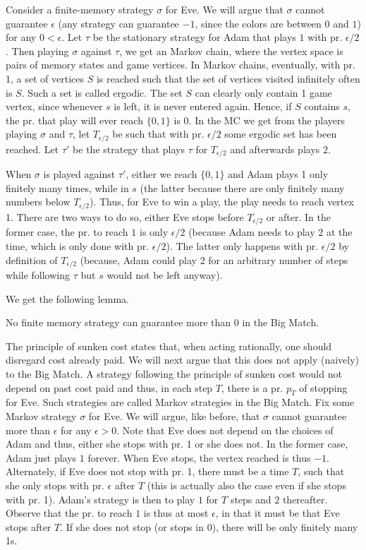 Consider a finite-memory strategy $\sigma$ for Eve. We will argue that $\sigma$ cannot guarantee $\epsilon$ (any strategy can guarantee $-1$, since the colors are between $0$ and $1$) for any $0<\epsilon$. Let $\tau$ be the stationary strategy for Adam that plays $1$ with pr. $\epsilon/2$.
Then playing $\sigma$ against $\tau$, we get an Markov chain, where the vertex space is pairs of memory states and game vertices. 
In Markov chains, eventually, with pr. 1, a set of vertices $S$ is reached such that the set of vertices visited infinitely often is $S$. Such a set is called ergodic.
The set $S$ can clearly only contain 1 game vertex, since whenever $s$ is left, it is never entered again.
Hence, if $S$ contains $s$, the pr. that play will ever reach $\{0,1\}$ is 0.
In the MC we get from the players playing $\sigma$ and $\tau$, let $T_{\epsilon/2}$ be such that with pr. $\epsilon/2$ some ergodic set has been reached. 
Let $\tau'$ be the strategy that plays $\tau$ for $T_{\epsilon/2}$ and afterwards plays $2$. 

When $\sigma$ is played against $\tau'$, either we reach $\{0,1\}$ and Adam plays 1 only finitely many times, while in $s$ (the latter because there are only finitely many numbers below $T_{\epsilon/2}$). Thus, for Eve to win a play, the play needs to reach vertex 1. There are two ways to do so, either Eve stops before $T_{\epsilon/2}$ or after. In the former case, the pr. to reach $1$ is only $\epsilon/2$ (because Adam needs to play $2$ at the time, which is only done with pr. $\epsilon/2$). The latter only happens with pr. $\epsilon/2$ by definition of $T_{\epsilon/2}$ (because, Adam could play $2$ for an arbitrary number of steps while following $\tau$ but $s$ would not be left anyway).

We get the following lemma.

\begin{lemma}\label{lemm:no_finite_meanpayoff}
No finite memory strategy can guarantee more than $0$ in the Big Match.
\end{lemma}

The principle of sunken cost states that, when acting rationally, one should disregard cost already paid. We will next argue that this does not apply (naively) to the Big Match.
A strategy following the principle of sunken cost would not depend on past cost paid and thus, in each step $T$, there is a pr. $p_T$ of stopping for Eve.
Such strategies are called Markov strategies in the Big Match.
Fix some Markov strategy $\sigma$ for Eve. We will argue, like before, that $\sigma$ cannot guarantee more than $\epsilon$ for any $\epsilon>0$.
Note that Eve does not depend on the choices of Adam and thus, either she stops with pr. 1 or she does not.
In the former case, Adam just plays $1$ forever. When Eve stops, the vertex reached is thus $-1$.
Alternately, if Eve does not stop with pr. 1, there must be a time $T$, such that she only stops with pr. $\epsilon$ after $T$ (this is actually also the case even if she stops with pr. 1). 
Adam's strategy is then to play $1$ for $T$ steps and $2$ thereafter. Observe that the pr. to reach $1$ is thus at most $\epsilon$, in that it must be that Eve stops after $T$. If she does not stop (or stops in $0$), there will be only finitely many 1s.

